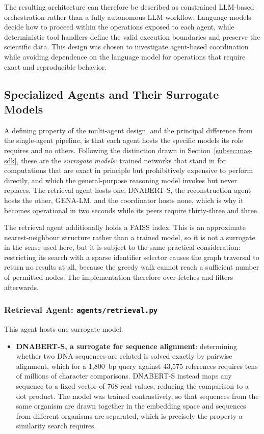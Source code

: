 The resulting architecture can therefore be described as constrained
LLM-based orchestration rather than a fully autonomous LLM workflow. Language
models decide how to proceed within the operations exposed to each agent, while
deterministic tool handlers define the valid execution boundaries and preserve
the scientific data. This design was chosen to investigate agent-based
coordination while avoiding dependence on the language model for operations
that require exact and reproducible behavior.

\subsection{Specialized Agents and Their Surrogate Models}
\label{subsec:mas-surrogates}

A defining property of the multi-agent design, and the principal difference from the
single-agent pipeline, is that each agent hosts the specific models its role requires and no
others. Following the distinction drawn in Section~\ref{subsec:mas-sdk}, these are the
\textit{surrogate models}: trained networks that stand in for computations that are exact in
principle but prohibitively expensive to perform directly, and which the general-purpose
reasoning model invokes but never replaces. The retrieval agent hosts one, DNABERT-S, the
reconstruction agent hosts the other, GENA-LM, and the coordinator hosts none, which is why
it becomes operational in two seconds while its peers require thirty-three and three.

The retrieval agent additionally holds a FAISS index. This is an approximate
nearest-neighbour structure rather than a trained model, so it is not a surrogate in the
sense used here, but it is subject to the same practical consideration: restricting its
search with a sparse identifier selector causes the graph traversal to return no results at
all, because the greedy walk cannot reach a sufficient number of permitted nodes. The
implementation therefore over-fetches and filters afterwards.

\subsubsection{Retrieval Agent: \texttt{agents/retrieval.py}}

This agent hosts one surrogate model.

\begin{itemize}
    \item \textbf{DNABERT-S, a surrogate for sequence alignment}: determining whether two
    DNA sequences are related is solved exactly by pairwise alignment, which for a
    1{,}800~bp query against 43{,}575 references requires tens of millions of character
    comparisons. DNABERT-S instead maps any sequence to a fixed vector of 768 real values,
    reducing the comparison to a dot product. The model was trained contrastively, so that
    sequences from the same organism are drawn together in the embedding space and sequences
    from different organisms are separated, which is precisely the property a similarity
    search requires.

\end{itemize}

